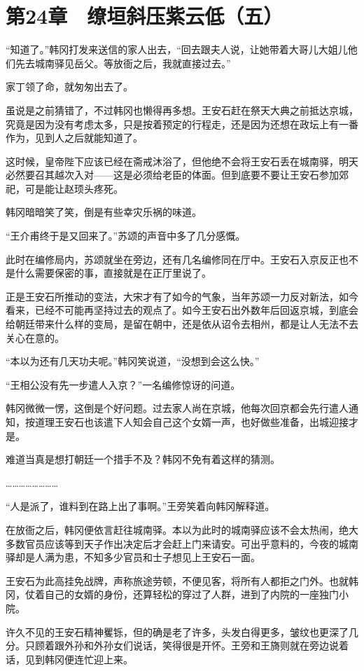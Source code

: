 \section{第24章　缭垣斜压紫云低（五）}

“知道了。”韩冈打发来送信的家人出去，“回去跟夫人说，让她带着大哥儿大姐儿他们先去城南驿见岳父。等放衙之后，我就直接过去。”

家丁领了命，就匆匆出去了。

虽说是之前猜错了，不过韩冈也懒得再多想。王安石赶在祭天大典之前抵达京城，究竟是因为没有考虑太多，只是按着预定的行程走，还是因为还想在政坛上有一番作为，见到人之后就能知道了。

这时候，皇帝陛下应该已经在斋戒沐浴了，但他绝不会将王安石丢在城南驿，明天必然要召其越次入对——这是必须给老臣的体面。但到底要不要让王安石参加郊祀，可是能让赵顼头疼死。

韩冈暗暗笑了笑，倒是有些幸灾乐祸的味道。

“王介甫终于是又回来了。”苏颂的声音中多了几分感慨。

此时在编修局内，苏颂就坐在旁边，还有几名编修同在厅中。王安石入京反正也不是什么需要保密的事，直接就是在正厅里说了。

正是王安石所推动的变法，大宋才有了如今的气象，当年苏颂一力反对新法，如今看来，已经不可能再坚持过去的观点了。如今王安石出外数年后回返京城，到底会给朝廷带来什么样的变局，是留在朝中，还是依从诏令去相州，都是让人无法不去关心在意的。

“本以为还有几天功夫呢。”韩冈笑说道，“没想到会这么快。”

“王相公没有先一步遣人入京？”一名编修惊讶的问道。

韩冈微微一愣，这倒是个好问题。过去家人尚在京城，他每次回京都会先行遣人通知，按道理王安石也该遣下人知会自己这个女婿一声，也好做些准备，出城迎接才是。

难道当真是想打朝廷一个措手不及？韩冈不免有着这样的猜测。

……………………

“人是派了，谁料到在路上出了事啊。”王旁笑着向韩冈解释道。

在放衙之后，韩冈便依言赶往城南驿。本以为此时的城南驿应该不会太热闹，绝大多数官员应该等到天子作出决定后才会赶上门来请安。可出乎意料的，今夜的城南驿却是人满为患，不知多少官员和士子想见上王安石一面。

王安石为此高挂免战牌，声称旅途劳顿，不便见客，将所有人都拒之门外。也就韩冈，仗着自己的女婿的身份，还算轻松的穿过了人群，进到了内院的一座独门小院。

许久不见的王安石精神矍铄，但的确是老了许多，头发白得更多，皱纹也更深了几分。只顾着跟外孙和外孙女们说话，笑得很是开怀。王旁和王旖则就在旁边说着话，见到韩冈便连忙迎上来。

